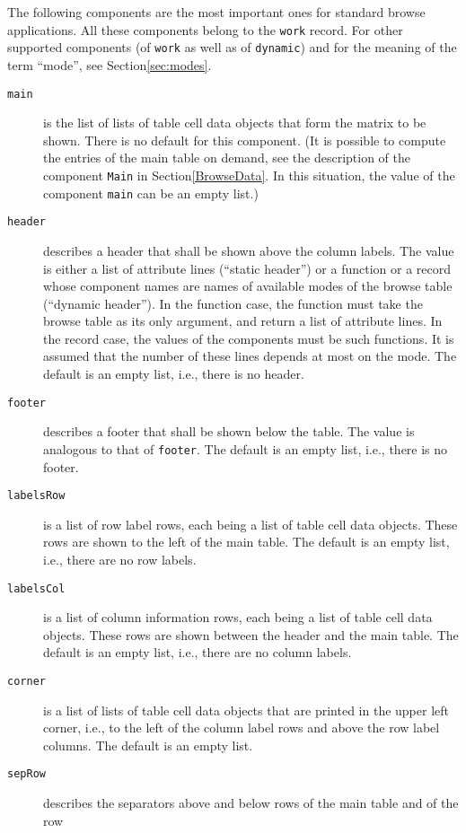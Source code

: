 \documentclass[a4paper,11pt]{report}
\begin{document}
{{{ The following components are the most important ones for standard browse
applications. All these components belong to the \texttt{work} record. For other supported components (of \texttt{work} as well as of \texttt{dynamic}) and for the meaning of the term ``mode'', see Section{\nobreakspace}\ref{sec:modes}. 
\begin{description}
\item[{\texttt{main}}]  is the list of lists of table cell data objects that form the matrix to be
shown. There is no default for this component. (It is possible to compute the
entries of the main table on demand, see the description of the component \texttt{Main} in Section{\nobreakspace}\ref{BrowseData}. In this situation, the value of the component \texttt{main} can be an empty list.) 
\item[{\texttt{header}}]  describes a header that shall be shown above the column labels. The value is
either a list of attribute lines (``static header'') or a function or a record whose component names are names of available modes
of the browse table (``dynamic header''). In the function case, the function must take the browse table as its only
argument, and return a list of attribute lines. In the record case, the values
of the components must be such functions. It is assumed that the number of
these lines depends at most on the mode. The default is an empty list,
i.{\nobreakspace}e., there is no header. 
\item[{\texttt{footer}}]  describes a footer that shall be shown below the table. The value is analogous
to that of \texttt{footer}. The default is an empty list, i.{\nobreakspace}e., there is no footer. 
\item[{\texttt{labelsRow}}]  is a list of row label rows, each being a list of table cell data objects.
These rows are shown to the left of the main table. The default is an empty
list, i.{\nobreakspace}e., there are no row labels. 
\item[{\texttt{labelsCol}}]  is a list of column information rows, each being a list of table cell data
objects. These rows are shown between the header and the main table. The
default is an empty list, i.{\nobreakspace}e., there are no column labels. 
\item[{\texttt{corner}}]  is a list of lists of table cell data objects that are printed in the upper
left corner, i.{\nobreakspace}e., to the left of the column label rows and
above the row label columns. The default is an empty list. 
\item[{\texttt{sepRow}}]  describes the separators above and below rows of the main table and of the row

\end{description}}}}
\end{document}
